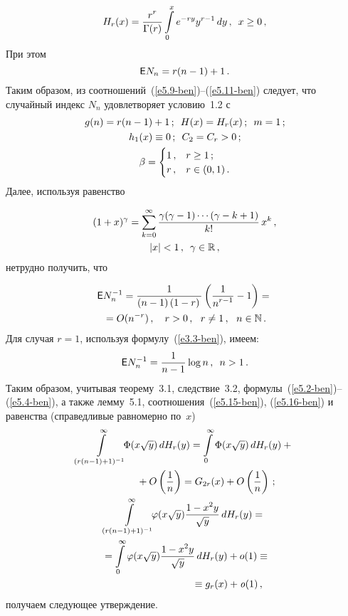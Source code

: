 \begin{multicols}{2}
\noindent
\begin{equation}
H_r(x) = \displaystyle\frac{\displaystyle r^r\mathstrut}{\displaystyle \Gamma(r)\mathstrut} \int\limits_0^x e^{-ry} y^{r-1} \,dy\,, 
\enskip
 x\ge 0\,,\label{e5.10-ben}
\end{equation}
 При этом
\begin{equation}
{\sf E} N_n = r(n - 1) + 1\,. \label{e5.11-ben}
\end{equation}
Таким образом, из соотношений~(\ref{e5.9-ben})--(\ref{e5.11-ben}) следует, что случайный
индекс $N_n$ удовлетворяет условию~1.2 с
\begin{gather*}
g(n) = r(n - 1) + 1\,; \enskip  H(x) = H_r(x)\,; \enskip  m = 1\,; %
\\
h_1(x) \equiv 0\,;  \enskip   C_2 = C_r > 0\,; %
\\
\beta = \begin{cases} 1\,, &  r \ge 1\,;\\ 
r\,, &  r \in (0,1)\,.
\end{cases}
\end{gather*}
Далее, используя равенство

\noindent
\begin{multline*}
(1 + x)^\gamma = \sum\limits_{k=0}^\infty \displaystyle\frac{\displaystyle \gamma(\gamma -
1)\cdots(\gamma - k + 1 )\mathstrut}{\displaystyle k!\mathstrut}\,  x^k\,, \\
    |x| < 1\,,\enskip  \gamma
 \in \mathbb R\,,
\end{multline*}
нетрудно получить, что
\columnbreak


\noindent
\begin{multline}
{\sf E} N_n^{-1} = \displaystyle\frac{\displaystyle 1\mathstrut}{\displaystyle (n - 1) \left(1 - r\right)\mathstrut}\left(\displaystyle\frac{\displaystyle 1\mathstrut}{\displaystyle n^{r-1}\mathstrut} -
1\right) ={}\\
{}= {O}(n^{-r})\,, \ \ \   r > 0\,, \ \   r \ne 1\,, \ \  n \in \mathbb N\,.
\label{e5.15-ben}
\end{multline}
Для случая $r=1$, используя формулу~(\ref{e3.3-ben}), имеем:
\begin{equation}
{\sf E} N_n^{-1} = \displaystyle\frac{\displaystyle 1\mathstrut}{\displaystyle n - 1\mathstrut} \log n\,, \enskip  n > 1\,. \label{e5.16-ben}
\end{equation}
Таким образом, учитывая теорему~3.1, следствие~3.2, формулы~(\ref{e5.2-ben})--(\ref{e5.4-ben}),
а также лемму~5.1, соотношения~(\ref{e5.15-ben}), (\ref{e5.16-ben}) и
равенства (справедливые равномерно по~$x$)
\begin{gather}
\int\limits_{(r(n-1)+1)^{-1}}^\infty \!\!\!\Phi(x\sqrt y)\, dH_r(y) =
 \int\limits_{0}^\infty \Phi(x\sqrt y)\, dH_r(y) +{}\notag\\
 \hspace*{15mm}{}+
{O}\left(\fr{1}{n}\right) =
 G_{2r}(x) + O\left(\fr{1}{n}\right)\,;\label{e5.17-ben}
\\
\int\limits_{(r(n-1)+1)^{-1}}^\infty \!\!\!\varphi(x\sqrt y)
\fr{1-x^2y}{\sqrt y}\, dH_r(y) ={}\notag\\
{}=
 \int\limits_{0}^\infty \varphi(x\sqrt y) \fr{1-x^2y}{\sqrt y}\,
dH_r(y) +  o(1) \equiv\notag\\
{}\hspace*{30mm}\equiv g_{r}(x) + {\it o}(1)\,,\label{e5.18-ben}
\end{gather}
получаем следующее утверждение.


\end{multicols}
